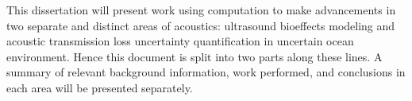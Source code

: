 This dissertation will present work using computation to make
advancements in two separate and distinct areas of acoustics:
ultrasound bioeffects modeling and acoustic transmission loss
uncertainty quantification in uncertain ocean environment. Hence this
document is split into two parts along these lines. A summary of
relevant background information, work performed, and conclusions in
each area will be presented separately.
